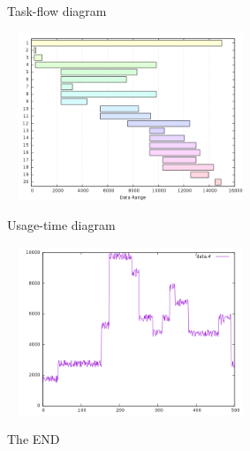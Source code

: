 \documentclass[18pt]{beamer}
\begin{document}
	\begin{frame}{Task-flow diagram}
		\begin{center}
			\includegraphics[width=280px, height=190px]{images/taskflow.png}
		\end{center}		
	\end{frame}
	
	\begin{frame}{Usage-time diagram}
		\begin{center}
			\includegraphics[width=280px, height=190px]{images/nodeusage.png}
		\end{center}		
	\end{frame}
	
	\begin{frame}
		\begin{center}
			The END
		\end{center}		
	\end{frame}
	
\end{document}
